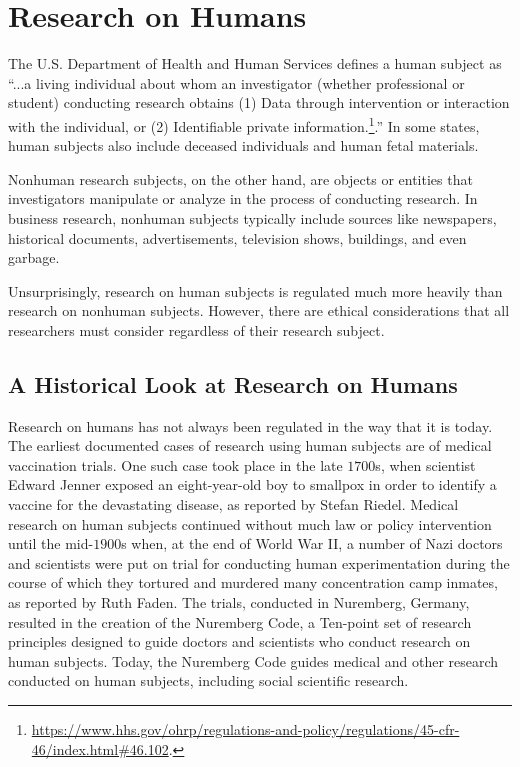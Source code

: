 \section{Research on Humans}

The U.S. Department of Health and Human Services defines a human subject as ``...a living individual about whom an investigator (whether professional or student) conducting research obtains (1) Data through intervention or interaction with the individual, or (2) Identifiable private information.\footnote{\url{https://www.hhs.gov/ohrp/regulations-and-policy/regulations/45-cfr-46/index.html\#46.102}.}.'' In some states, human subjects also include deceased individuals and human fetal materials. 

Nonhuman research subjects, on the other hand, are objects or entities that investigators manipulate or analyze in the process of conducting research. In business research, nonhuman subjects typically include sources like newspapers, historical documents, advertisements, television shows, buildings, and even garbage.

Unsurprisingly, research on human subjects is regulated much more heavily than research on nonhuman subjects. However, there are ethical considerations that all researchers must consider regardless of their research subject.

\subsection{A Historical Look at Research on Humans}

Research on humans has not always been regulated in the way that it is today. The earliest documented cases of research using human subjects are of medical vaccination trials. One such case took place in the late $ 1700 $s, when scientist Edward Jenner exposed an eight-year-old boy to smallpox in order to identify a vaccine for the devastating disease, as reported by Stefan Riedel\cite{riedel2005edward}. Medical research on human subjects continued without much law or policy intervention until the mid-$ 1900 $s when, at the end of World War II, a number of Nazi doctors and scientists were put on trial for conducting human experimentation during the course of which they tortured and murdered many concentration camp inmates, as reported by Ruth Faden\cite{faden1986history}. The trials, conducted in Nuremberg, Germany, resulted in the creation of the Nuremberg Code, a Ten-point set of research principles designed to guide doctors and scientists who conduct research on human subjects. Today, the Nuremberg Code guides medical and other research conducted on human subjects, including social scientific research.

